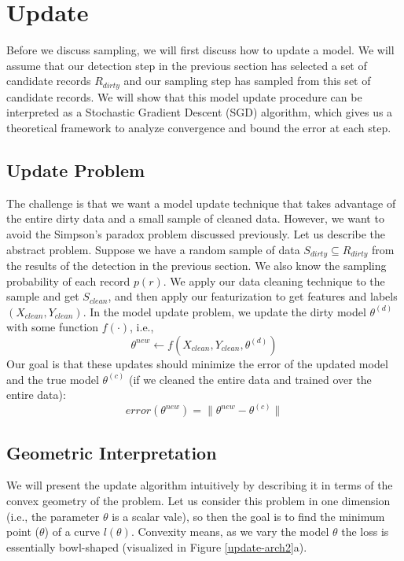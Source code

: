 \section{Update}\label{model-update}
Before we discuss sampling, we will first discuss how to update a model.
We will assume that our detection step in the previous section has selected 
a set of candidate records $R_{dirty}$ and our sampling step has sampled from this
set of candidate records.
We will show that this model update procedure can be interpreted as a Stochastic 
Gradient Descent (SGD) algorithm, which gives us a theoretical framework to analyze
convergence and bound the error at each step.

\subsection{Update Problem}
The challenge is that we want a model update technique that takes advantage of the entire dirty data and a small sample of cleaned data.
However, we want to avoid the Simpson's paradox problem discussed previously.
Let us describe the abstract problem.
Suppose we have a random sample of data $S_{dirty} \subseteq R_{dirty}$ from the results of the detection in the previous section.
We also know the sampling probability of each record $p(r)$.
We apply our data cleaning technique to the sample and get $S_{clean}$, and then apply our featurization to get features and labels $(X_{clean},Y_{clean})$. 
In the model update problem, we update the dirty model $\theta^{(d)}$ with some function $f(\cdot)$, i.e.,
\[
\theta^{new} \leftarrow f(X_{clean},Y_{clean},\theta^{(d)})
\]
Our goal is that these updates should minimize the error of the updated model and the true model $\theta^{(c)}$ (if we cleaned the entire data and trained over the entire data):
\[
error(\theta^{new}) = \| \theta^{new} - \theta^{(c)} \|
\]

\subsection{Geometric Interpretation}
We will present the update algorithm intuitively by describing it in terms of the convex geometry of the problem.
Let us consider this problem in one dimension (i.e., the parameter $\theta$ is a scalar vale), so then the goal is to find the minimum point ($\theta$) of a curve $l(\theta)$.
Convexity means, as we vary the model $\theta$ the loss is essentially bowl-shaped (visualized in Figure \ref{update-arch2}a).

